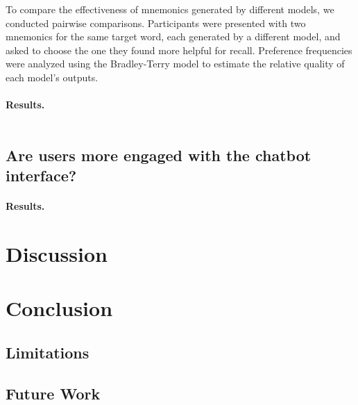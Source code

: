 \documentclass{article}
\newcounter{para}
\begin{document}
To compare the effectiveness of mnemonics generated by different models, we conducted pairwise comparisons. Participants were presented with two mnemonics for the same target word, each generated by a different model, and asked to choose the one they found more helpful for recall. Preference frequencies were analyzed using the Bradley-Terry model to estimate the relative quality of each model's outputs.


\paragraph{Results.}

\begin{table} \label{tab:model-comparison}
  \centering
  \begin{tabular}{lll}

  \end{tabular}
\end{table}

\subsection{Are users more engaged with the chatbot interface?} \label{sec:engagement}

\paragraph{Results.}

\section{Discussion}
\section{Conclusion}
\subsection{Limitations}
\subsection{Future Work}
\end{document}
